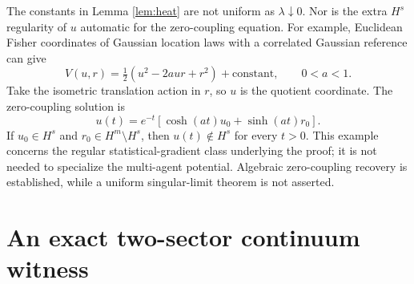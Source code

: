 \documentclass[11pt]{article}
\begin{document}
The constants in Lemma \ref{lem:heat} are not uniform as $\lambda\downarrow0$. Nor is the extra $H^s$ regularity of $u$ automatic for the zero-coupling equation. For example, Euclidean Fisher coordinates of Gaussian location laws with a correlated Gaussian reference can give
\begin{equation}
 V(u,r)=\tfrac12(u^2-2aur+r^2)+\text{constant},\qquad 0<a<1.
\end{equation}
Take the isometric translation action in $r$, so $u$ is the quotient coordinate. The zero-coupling solution is
\begin{equation}
 u(t)=e^{-t}[\cosh(at)u_0+\sinh(at)r_0].
\end{equation}
If $u_0\in H^s$ and $r_0\in H^m\setminus H^s$, then $u(t)\notin H^s$ for every $t>0$. This example concerns the regular statistical-gradient class underlying the proof; it is not needed to specialize the multi-agent potential. Algebraic zero-coupling recovery is established, while a uniform singular-limit theorem is not asserted.

\section{An exact two-sector continuum witness}
\end{document}
